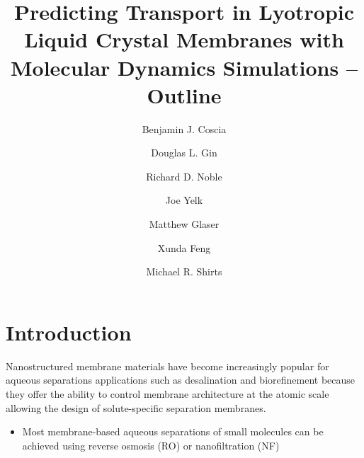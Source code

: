 \documentclass{article}
\title{Predicting Transport in Lyotropic Liquid Crystal Membranes with Molecular Dynamics Simulations -- Outline}
\author{Benjamin J. Coscia \and Douglas L. Gin \and Richard D. Noble \and Joe Yelk \and Matthew Glaser \and Xunda Feng \and Michael R. Shirts}
\begin{document}
  
  \graphicspath{{./figures/}}
  \maketitle
  \section*{Introduction}
  
  Nanostructured membrane materials have become increasingly popular for 
  aqueous separations applications such as desalination and biorefinement
  because they offer the ability to control membrane architecture at the
  atomic scale allowing the design of solute-specific separation membranes. \cite{humplik_nanostructured_2011}
  \begin{itemize}
    \item Most membrane-based aqueous separations of small molecules can 
    be achieved using reverse osmosis (RO) or nanofiltration (NF) \cite{van_der_bruggen_review_2003}
  \end{itemize}
  
\end{document}
